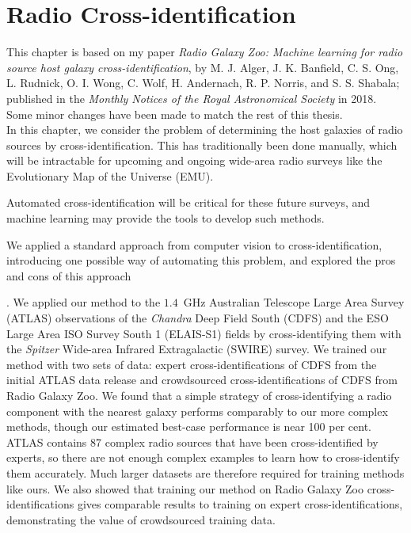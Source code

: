 \chapter{Radio Cross-identification}
\label{cha:cross-id}


This chapter is based on my paper \emph{Radio Galaxy Zoo: Machine learning for radio source host galaxy cross-identification}, by M. J. Alger, J. K. Banfield, C. S. Ong, L. Rudnick, O. I. Wong, C. Wolf, H. Andernach, R. P. Norris, and S. S. Shabala; published in the \emph{Monthly Notices of the Royal Astronomical Society} in 2018. Some minor changes have been made to match the rest of this thesis.\\

In this chapter, we consider the problem of determining the host galaxies of radio sources by cross-identification. This has traditionally been done manually, which will be intractable for upcoming and ongoing wide-area radio surveys like the Evolutionary Map of the Universe (EMU). {Automated cross-identification will be critical for these future surveys, and machine learning may provide the tools to develop such methods.

We applied a standard approach from computer vision to cross-identification, introducing one possible way of automating this problem, and explored the pros and cons of this approach}. We applied our method to the $1.4$~GHz Australian Telescope Large Area Survey (ATLAS) observations of the \emph{Chandra} Deep Field South (CDFS) and the ESO Large Area ISO Survey South 1 (ELAIS-S1) fields by cross-identifying them with the \emph{Spitzer} Wide-area Infrared Extragalactic (SWIRE) survey. We trained our method with two sets of data: expert cross-identifications of CDFS from the initial ATLAS data release and crowdsourced cross-identifications of CDFS from Radio Galaxy Zoo. {We found that a simple strategy of cross-identifying a radio component with the nearest galaxy performs comparably to our more complex methods, though our estimated best-case performance is near 100 per cent. ATLAS contains 87 complex radio sources that have been cross-identified by experts, so there are not enough complex examples to learn how to cross-identify them accurately. Much larger datasets are therefore required for training methods like ours. We also showed that training our method on Radio Galaxy Zoo cross-identifications gives comparable results to training on expert cross-identifications, demonstrating the value of crowdsourced training data.}

